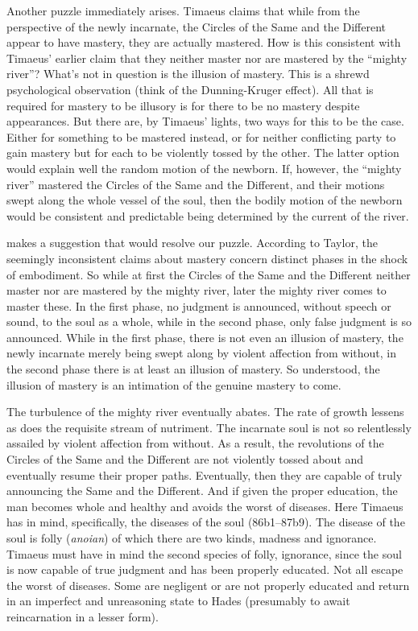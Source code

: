 Another puzzle immediately arises. Timaeus claims that while from the perspective of the newly incarnate, the Circles of the Same and the Different appear to have mastery, they are actually mastered. How is this consistent with Timaeus' earlier claim that they neither master nor are mastered by the ``mighty river''? What's not in question is the illusion of mastery. This is a shrewd psychological observation (think of the Dunning-Kruger effect). All that is required for mastery to be illusory is for there to be no mastery despite appearances. But there are, by Timaeus' lights, two ways for this to be the case. Either for something to be mastered instead, or for neither conflicting party to gain mastery but for each to be violently tossed by the other. The latter option would explain well the random motion of the newborn. If, however, the ``mighty river'' mastered the Circles of the Same and the Different, and their motions swept along the whole vessel of the soul, then the bodily motion of the newborn would be consistent and predictable being determined by the current of the river. 

\citet[271]{Taylor:1928qb} makes a suggestion that would resolve our puzzle. According to Taylor, the seemingly inconsistent claims about mastery concern distinct phases in the shock of embodiment. So while at first the Circles of the Same and the Different neither master nor are mastered by the mighty river, later the mighty river comes to master these. In the first phase, no judgment is announced, without speech or sound, to the soul as a whole, while in the second phase, only false judgment is so announced. While in the first phase, there is not even an illusion of mastery, the newly incarnate merely being swept along by violent affection from without, in the second phase there is at least an illusion of mastery. So understood, the illusion of mastery is an intimation of the genuine mastery to come. 

The turbulence of the mighty river eventually abates. The rate of growth lessens as does the requisite stream of nutriment. The incarnate soul is not so relentlessly assailed by violent affection from without. As a result, the revolutions of the Circles of the Same and the Different are not violently tossed about and eventually resume their proper paths. Eventually, then they are capable of truly announcing the Same and the Different. And if given the proper education, the man becomes whole and healthy and avoids the worst of diseases. Here Timaeus has in mind, specifically, the diseases of the soul (86b1--87b9). The disease of the soul is folly (\emph{anoian}) of which there are two kinds, madness and ignorance. Timaeus must have in mind the second species of folly, ignorance, since the soul is now capable of true judgment and has been properly educated. Not all escape the worst of diseases. Some are negligent or are not properly educated and return in an imperfect and unreasoning state to Hades (presumably to await reincarnation in a lesser form).

